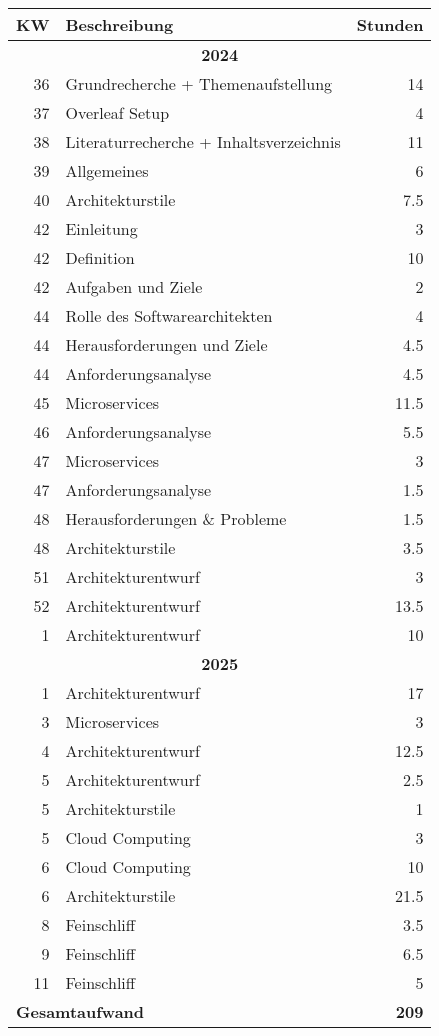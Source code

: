 \begin{table}[H]
    \centering
    \begin{tabular}{|r|l|r|}
    \hline
    \textbf{KW} & \textbf{Beschreibung} & \textbf{Stunden}\\ \hline
    \multicolumn{3}{|c|}{\textbf{2024}}\\ \hline
    36 & Grundrecherche + Themenaufstellung & 14\\ \hline
    37 & Overleaf Setup & 4\\ \hline
    38 & Literaturrecherche + Inhaltsverzeichnis & 11\\ \hline
    39 & Allgemeines & 6\\ \hline
    40 & Architekturstile & 7.5\\ \hline 
    42 & Einleitung & 3 \\ \hline
    42 & Definition & 10 \\ \hline
    42 & Aufgaben und Ziele & 2 \\ \hline
    44 & Rolle des Softwarearchitekten & 4 \\ \hline
    44 & Herausforderungen und Ziele & 4.5 \\ \hline
    44 & Anforderungsanalyse & 4.5 \\ \hline
    45 & Microservices & 11.5 \\ \hline
    46 & Anforderungsanalyse & 5.5 \\ \hline
    47 & Microservices & 3 \\ \hline
    47 & Anforderungsanalyse & 1.5 \\ \hline
    48 & Herausforderungen \& Probleme & 1.5 \\ \hline
    48 & Architekturstile & 3.5 \\ \hline
    51 & Architekturentwurf & 3 \\ \hline
    52 & Architekturentwurf & 13.5 \\ \hline
    1 & Architekturentwurf & 10 \\ \hline
    \multicolumn{3}{|c|}{\textbf{2025}}\\ \hline
    1 & Architekturentwurf & 17 \\ \hline
    3 & Microservices & 3 \\ \hline
    4 & Architekturentwurf & 12.5 \\ \hline
    5 & Architekturentwurf & 2.5 \\ \hline
    5 & Architekturstile & 1 \\ \hline
    5 & Cloud Computing & 3 \\ \hline
    6 & Cloud Computing & 10 \\ \hline
    6 & Architekturstile & 21.5 \\ \hline
    8 & Feinschliff & 3.5 \\ \hline
    9 & Feinschliff & 6.5 \\ \hline
    11 & Feinschliff & 5 \\ \hline
    \multicolumn{2}{|l|}{\textbf{Gesamtaufwand}} & \textbf{209}\\ \hline \hline  
    \end{tabular}
\end{table}